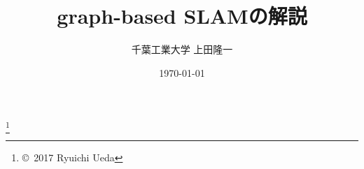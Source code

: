 \documentclass[11pt,a4paper]{jsarticle}
\title{graph-based SLAMの解説}
\author{千葉工業大学 上田隆一}
\date{\today}
\begin{document}
\maketitle

\footnote[0]{\copyright\ 2017 Ryuichi Ueda}
%
%

%
%
\begin{footnotesize}


\end{footnotesize}
\end{document}
